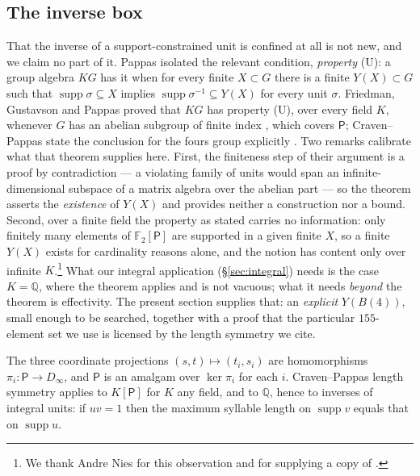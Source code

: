 \documentclass[11pt]{amsart}
\theoremstyle{definition}
\newcommand{\F}{\mathbb{F}}
\newcommand{\Q}{\mathbb{Q}}
\renewcommand{\P}{\mathsf{P}}
\newcommand{\Ball}[1]{B(#1)}
\newcommand{\supp}{\operatorname{supp}}
\begin{document}
\subsection{The inverse box}\label{sec:box}
That the inverse of a support-constrained unit is confined at all is not new,
and we claim no part of it. Pappas \cite{Pappas1988} isolated the relevant
condition, \emph{property} (U): a group algebra $KG$ has it when for every
finite $X\subset G$ there is a finite $Y(X)\subset G$ such that
$\supp\sigma\subseteq X$ implies $\supp\sigma^{-1}\subseteq Y(X)$ for every
unit $\sigma$. Friedman, Gustavson and Pappas proved that $KG$ has property
(U), over every field $K$, whenever $G$ has an abelian subgroup of finite
index \cite[Thm.~2.3]{FGP1995}, which covers $\P$; Craven--Pappas state the
conclusion for the fours group explicitly \cite[Thm.~14.3]{CravenPappas2013}.
Two remarks calibrate what that theorem supplies here. First, the finiteness
step of their argument \cite[Lemma~2.2]{FGP1995} is a proof by contradiction
--- a violating family of units would span an infinite-dimensional subspace of
a matrix algebra over the abelian part --- so the theorem asserts the
\emph{existence} of $Y(X)$ and provides neither a construction nor a bound.
Second, over a finite field the property as stated carries no information:
only finitely many elements of $\F_2[\P]$ are supported in a given finite
$X$, so a finite $Y(X)$ exists for cardinality reasons alone, and the notion
has content only over infinite $K$.\footnote{We thank Andre Nies for this
observation and for supplying a copy of \cite{FGP1995}.} What our integral
application (\S\ref{sec:integral}) needs is the case $K=\Q$, where the
theorem applies and is not vacuous; what it needs \emph{beyond} the theorem
is effectivity. The present section supplies that: an \emph{explicit}
$Y(\Ball4)$, small enough to be searched, together with a proof that the
particular $155$-element set we use is licensed by the length symmetry we
cite.

The three coordinate projections $(s,t)\mapsto(t_i,s_i)$ are homomorphisms
$\pi_i\colon\P\to D_\infty$, and $\P$ is an amalgam over $\ker\pi_i$ for each
$i$. Craven--Pappas length symmetry \cite[Thms.~4.9--4.10]{CravenPappas2013}
applies to $K[\P]$ for $K$ any field, and to $\Q$, hence to inverses of
integral units: if $uv=1$ then the maximum syllable length on $\supp v$ equals
that on $\supp u$.
\end{document}
